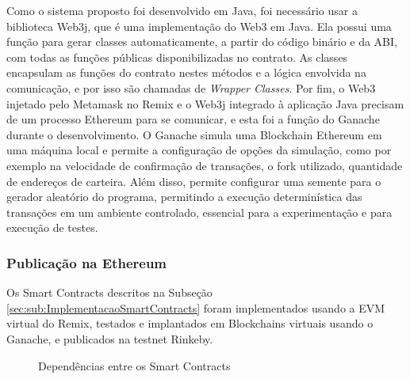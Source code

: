 \documentclass[a4paper,11pt]{article}
\begin{document}
Como o sistema proposto foi desenvolvido em Java, foi necessário usar a biblioteca Web3j, que é uma implementação do Web3 em Java. Ela possui uma função para gerar classes automaticamente, a partir do código binário e da ABI, com todas as funções públicas disponibilizadas no contrato.
As classes encapsulam as funções do contrato nestes métodos e a lógica envolvida na comunicação, e por isso são chamadas de \emph{Wrapper Classes}.
Por fim, o Web3 injetado pelo Metamask no Remix e o Web3j integrado à aplicação Java precisam de um processo Ethereum para se comunicar, e esta foi a função do Ganache durante o desenvolvimento.
O Ganache simula uma Blockchain Ethereum em uma máquina local e permite a configuração de opções da simulação, como por exemplo na velocidade de confirmação de transações, o fork utilizado, quantidade de endereços de carteira. Além disso, permite configurar uma semente para o gerador aleatório do programa, permitindo a execução determinística das transações em um ambiente controlado, essencial para a experimentação e para execução de testes.



\subsubsection{Publicação na Ethereum}


Os Smart Contracts descritos na Subseção \ref{sec:sub:ImplementacaoSmartContracts} foram implementados usando a EVM virtual do Remix, testados e implantados em Blockchains virtuais usando o Ganache, e  publicados na testnet Rinkeby.

\begin{figure}[!h]
  \centering
  
  \caption{Dependências entre os Smart Contracts}
  \label{fig:dependenciasSmartContracts}
\end{figure}
\end{document}
